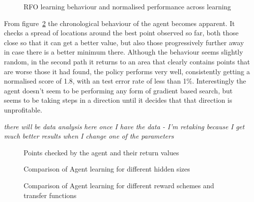 \begin{figure}
\centering


\caption{RFO learning behaviour and normalised performance across learning}
\label{fig:opt1norm}
\end{figure}



From figure~\ref{fig:locexp} the chronological behaviour of the agent becomes apparent. It checks a spread of locations around the best point observed so far, both those close so that it can get a better value, but also those progressively further away in case there is a better minimum there. Although the behaviour seems slightly random, in the second path it returns to an area that clearly contains points that are worse those it had found, the policy performs very well, consistently getting a normalised score of 1.8, with an test error rate of less than 1\%. Interestingly the agent doesn't seem to be performing any form of gradient based search, but seems to be taking steps in a direction until it decides that that direction is unprofitable.

\emph{there will be data analysis here once I have the data - I'm retaking because I get much better results when I change one of the parameters}



\begin{figure}
\centering

\caption{Points checked by the agent and their return values}
\label{fig:locexp}
\end{figure}

\begin{figure}
\centering

\caption{Comparison of Agent learning for different hidden sizes}
\label{fig:exp1rfo}
\end{figure}

\begin{figure}
\centering

\caption{Comparison of Agent learning for different reward schemes and transfer functions}
\label{fig:exp3rfo}
\end{figure}

